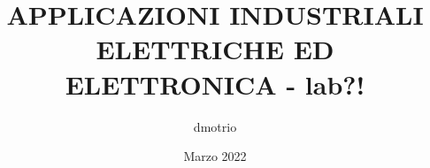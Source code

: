 \documentclass{article}
\begin{document}
    \author{dmotrio}
    \title{APPLICAZIONI INDUSTRIALI ELETTRICHE ED ELETTRONICA - lab?!}
    \date{Marzo 2022}

    \maketitle
    \tableofcontents

    \listoffigures
    \listoftables

    
    
    
\end{document}
